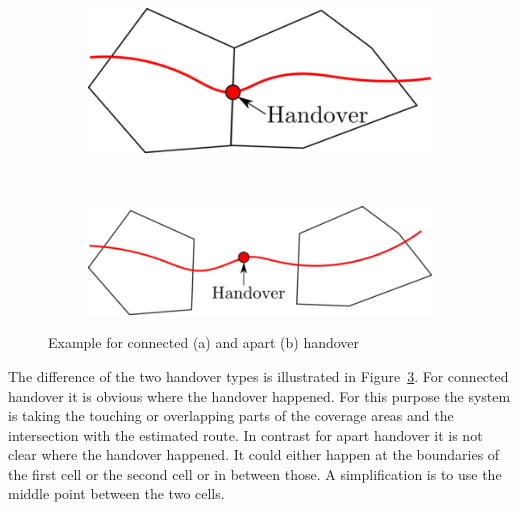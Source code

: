 \documentclass[master,english]{hgbthesis}
\begin{document}
\begin{figure}

	\centering

	\begin{subfigure}[b]{0.4\textwidth}

		\includegraphics[width=\textwidth]{handover_together.png}

		\caption{}

		\label{fig:handovertogether}

	\end{subfigure}%

	~ %


	\begin{subfigure}[b]{0.55\textwidth}

		\includegraphics[width=\textwidth]{handover_apart.png}

		\caption{}

		\label{fig:handoverapart}

	\end{subfigure}

	\caption{Example for connected (a) and apart (b) handover}

	\label{fig:handovertypes}

\end{figure}

The difference of the two handover types is illustrated in Figure~\ref{fig:handovertypes}. For connected handover it is obvious where the handover happened. For this purpose the system is taking the touching or overlapping parts of the coverage areas and the intersection with the estimated route. In contrast for apart handover it is not clear where the handover happened. It could either happen at the boundaries of the first cell or the second cell or in between those. A simplification is to use the middle point between the two cells.
\end{document}
